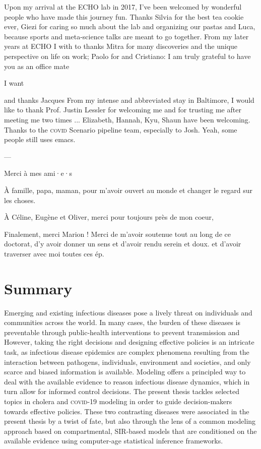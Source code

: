  Upon my arrival at the ECHO lab in 2017, I've been welcomed by wonderful people who have made this journey fun. Thanks Silvia for the best tea cookie ever, Giezi for caring so much about the lab and organizing our pastas and Luca, because sports and meta-science talks are meant to go together. From my later years at ECHO I with to thanks Mitra for many discoveries and the unique perspective on life on work; Paolo for and Cristiano: I am truly grateful to have you as an office mate
 
 I want 
 
 and thanks Jacques
 From my intense and abbreviated stay in Baltimore, I would like to thank Prof. Justin Lessler for welcoming me and for trusting me after meeting me two times ... Elizabeth, Hannah, Kyu, Shaun have been welcoming. Thanks to the \textsc{covid} Scenario pipeline team, especially to Josh.  Yeah, some people still uses emacs.
 
 --- 
 
 Merci à mes ami·e·s

À famille, papa, maman, pour m'avoir ouvert au monde et changer le regard sur les choses.

À Céline, Eugène et Oliver, merci pour toujours près de mon coeur, 

Finalement, merci Marion ! Merci de m'avoir soutenue tout au long de ce doctorat, d'y avoir donner un sens et d'avoir rendu  serein et doux. 
 et d'avoir traverser avec moi toutes ces ép.  
 
 \chapter*{Summary} %
Emerging and existing infectious diseases pose a lively threat on individuals and communities across the world. In many cases, the burden of these diseases is preventable through public-health interventions to prevent transmission and  However, taking the right decisions and designing effective policies is an intricate task, as infectious disease epidemics are complex phenomena resulting from the interaction between pathogens, individuals, environment and societies, and only scarce and biased information is available.  Modeling offers a principled way to deal with the available evidence to reason infectious disease dynamics, which in turn allow for informed control decisions. The present thesis tackles selected topics in cholera and \textsc{covid}-19 modeling in order to guide decision-makers towards effective policies. These two contrasting diseases were associated in the present thesis by a twist of fate, but also through the lens of a common modeling approach based on compartmental, SIR-based models that are conditioned on the available evidence using computer-age statistical inference frameworks.

